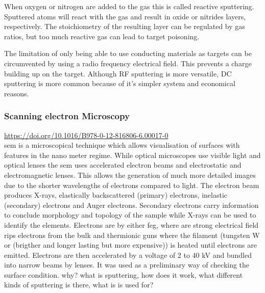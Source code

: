 When oxygen or nitrogen are added to the  gas this is called reactive sputtering.
Sputtered atoms will react with the gas and result in oxide or nitrides layers, respectively.
The stoichiometry of the resulting layer can be regulated by gas ratios, but too much reactive gas can lead to target poisoning.

The limitation of only being able to use conducting materials as targets can be circumvented by using a radio frequency electrical field. 
This prevents a charge building up on the target. 
Although RF sputtering is more versatile, DC sputtering is more common because of it's simpler system and economical reasons.

\subsubsection{Scanning electron Microscopy}
\url{https://doi.org/10.1016/B978-0-12-816806-6.00017-0}\\
\Gls{sem} is a microscopical technique which allows visualisation of surfaces with features in the nano meter regime. 
While optical microscopes use visible light and optical lenses the \gls{sem} uses accelerated electron beams and electrostatic and electromagnetic lenses.
This allows the generation of much more detailed images due to the shorter wavelengths of electrons compared to light\cite{Kaliva2020}.
The electron beam produces X-rays, elastically backscattered (primary) electrons, inelastic (secondary) electrons and Auger electrons. 
Secondary electrons carry information to conclude morphology and topology of the sample while X-rays can be used to identify the elements. 
Electrons are  by either \gls{feg}, where are strong electrical field rips electrons from the bulk and thermionic guns where the filament (tungsten W or  (brigther and longer lasting but more expensive)) is heated until electrons are emitted. 
Electrons are then accelerated by a voltage of 2 to 40 kV and bundled into narrow beams\cite{Vernon2000} by lenses.
It was used as a preliminary way of checking the surface condition. 
why? 
what is sputtering, 
how does it work, 
what different kinds of sputtering is there, 
what is is used for? 
\cite{McMullan1995}
\cite{Vernon2000}
\cite{Kaliva2020}


